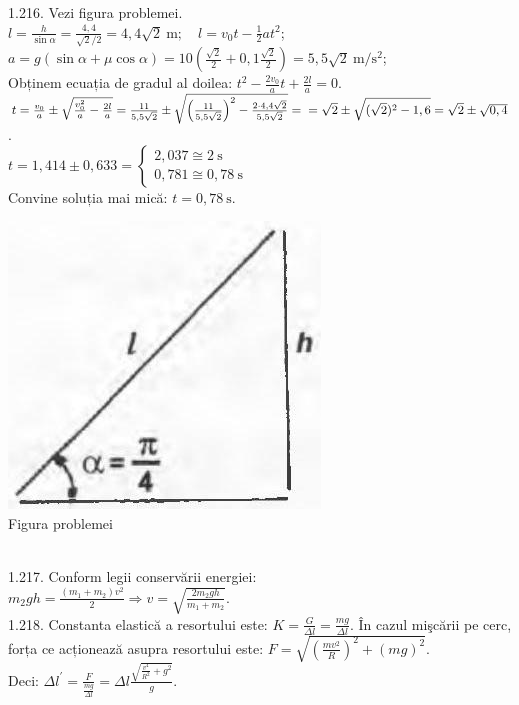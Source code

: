 1.216. Vezi figura problemei.\\ $l=\frac{h}{\sin \alpha}=\frac{4,4}{\sqrt{2} / 2}=4,4 \sqrt{2} \mathrm{~m}; \quad l=v_{0} t-\frac{1}{2} a t^{2}$;\\ $a=g(\sin \alpha+\mu \cos \alpha)=10\left(\frac{\sqrt{2}}{2}+0,1 \frac{\sqrt{2}}{2}\right)=5,5 \sqrt{2} \mathrm{~m} / \mathrm{s}^{2}$;\\ Obținem ecuația de gradul al doilea: $t^{2}-\frac{2 v_{0}}{a} t+\frac{2 l}{a}=0$.\\ $t=\frac{v_{0}}{a} \pm \sqrt{\frac{v_{0}^{2}}{a}-\frac{2 l}{a}}=\frac{11}{5,5 \sqrt{2}} \pm \sqrt{\left(\frac{11}{5,5 \sqrt{2}}\right)^{2}-\frac{2 \cdot 4,4 \sqrt{2}}{5,5 \sqrt{2}}}=\\ =\sqrt{2} \pm \sqrt{(\sqrt{2})^{2}-1,6}=\sqrt{2} \pm \sqrt{0,4}$.\\ $t=1,414 \pm 0,633=\left\{\begin{array}{l}2,037 \cong 2 \mathrm{~s} \\ 0,781 \cong 0,78 \mathrm{~s}\end{array}\right.$\\ Convine soluția mai mică: $t=0,78 \mathrm{~s}$.\\ \begin{center} \includegraphics[width=0.4\linewidth]{images/2025_07_01_5b3ff9fa0d508c8e9f17g-245(1)}\\ Figura problemei \end{center}\\

1.217. Conform legii conservării energiei:\\ $m_{2} g h=\frac{\left(m_{1}+m_{2}\right) v^{2}}{2} \Rightarrow v=\sqrt{\frac{2 m_{2} g h}{m_{1}+m_{2}}}$.\\

1.218. Constanta elastică a resortului este: $K=\frac{G}{\Delta l}=\frac{m g}{\Delta l}$. În cazul mişcării pe cerc, forța ce acționează asupra resortului este: $F=\sqrt{\left(\frac{m v^{2}}{R}\right)^{2}+(m g)^{2}}$.\\ Deci: $\Delta l^{\prime}=\frac{F}{\frac{m g}{\Delta l}}=\Delta l \frac{\sqrt{\frac{v^{4}}{R^{2}}+g^{2}}}{g}$.\\

